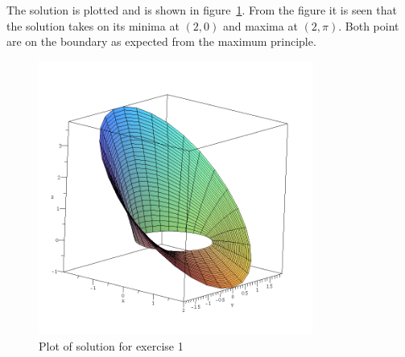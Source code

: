     The solution is plotted and is shown in figure~\ref{fig:q1-plot}. From the figure it is seen that the solution takes on its minima at $(2,0)$ and maxima at $(2,\pi)$. Both point are on the boundary as expected from the maximum principle.
    \begin{figure}
        \centering
        \includegraphics[width=90mm]{q1-plot.png}
        \caption{Plot of solution for exercise 1}
        \label{fig:q1-plot}
    \end{figure}

